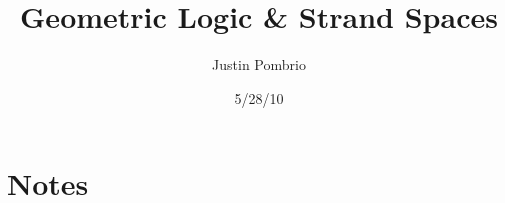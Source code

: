 \documentclass{article}
\begin{document}
\title{Geometric Logic & Strand Spaces}
\author{Justin Pombrio}
\date{5/28/10}

\newtheorem{theorem}{Theorem}

\newcommand{\closure}{\odot}
\newcommand{\OR}{\bigvee}
\newcommand{\AND}{\bigwedge}
\newcommand{\true}{\top}
\newcommand{\false}{\bot}
\newcommand{\imp}{\Rightarrow}
\newcommand{\seq}[2]{#1 \ \vdash\  #2}
\newcommand{\aseq}[2]{#1 & \ \vdash\  #2}

\newcommand{\indOr}{\vee}

\newcommand{\Node}{\mbox{Node}}
\newcommand{\Msg}{\mbox{Term}}
\newcommand{\Strand}{\mbox{Strand}}

\newcommand{\funcSig}[3]{#1 & : #2 \rightarrow #3}
\newcommand{\inv}[1]{#1^{-1}}
\newcommand{\invinv}[1]{#1^{-1 -1}}
\newcommand{\sk}[1]{\mbox{sk}(#1)}
\newcommand{\pk}[1]{\mbox{pk}(#1)}
\newcommand{\ltk}[1]{\mbox{lkt}(#1)}
\newcommand{\msg}[1]{\mbox{msg}(#1)}
\newcommand{\cat}[2]{#1 #2}
\newcommand{\enc}[2]{\{#1\}_{#2}}
\newcommand{\strand}[1]{\mbox{strand}(#1)}

\newcommand{\pred}[2]{#1 \leq #2}
\newcommand{\strPred}[2]{#1 \Rightarrow^* #2}
\newcommand{\outbound}[1]{+#1}
\newcommand{\inbound}[1]{-#1}
\newcommand{\non}[1]{\mbox{non } #1}
\newcommand{\uniq}[2]{#1 \mbox{ uniq-orig } #2}
\newcommand{\atomic}[1]{\mbox{atomic } #1}

\newcommand{\outPred}[2]{#1 \mbox{ out-pred } #2}
\newcommand{\subterm}[2]{#1 \sqsubseteq #2}
\newcommand{\visSubterm}[2]{#1 \sqsubseteq_v #2}
\newcommand{\avail}[1]{\mbox{avail } #1}
\newcommand{\unavail}[1]{\mbox{unavail } #1}
\newcommand{\comp}[1]{\mbox{compromised } #1}
\newcommand{\occ}[2]{#1 \mbox{ occ } #2}
\newcommand{\expl}[2]{#1 \mbox{ expl } #2}
\newcommand{\before}[2]{#1 \mbox{ sent-before } #2}


\section{Notes}
\end{document}

